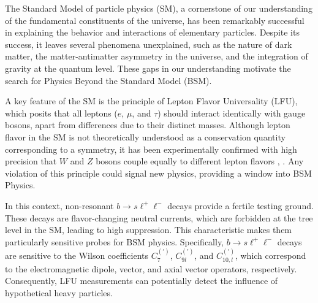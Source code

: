 The Standard Model of particle physics (SM), a cornerstone of our 
understanding of the fundamental constituents of the universe, 
has been remarkably successful in explaining the behavior 
and interactions of elementary particles. Despite its success, 
it leaves several phenomena unexplained, such as the 
nature of dark matter, the matter-antimatter asymmetry in the 
universe, and the integration of gravity at the quantum level. 
These gaps in our understanding motivate the search for Physics 
Beyond the Standard Model (BSM).\cite{SM_BSM}

A key feature of the SM is the principle of Lepton 
Flavor Universality (LFU), which posits that all leptons ($e$, 
$\mu$, and $\tau$) should interact identically with gauge bosons, 
apart from differences due to their distinct masses. Although 
lepton flavor in the SM is not theoretically understood 
as a conservation quantity corresponding to a symmetry, it has 
been experimentally confirmed with high precision that $W$ and $Z$ 
bosons couple equally to different lepton flavors \cite{LU_CDF}, 
\cite{LU_ATLAS}. Any violation of this principle could signal new 
physics, providing a window into BSM Physics.

In this context, non-resonant $b\to s\ell^+\ell^-$ decays provide a fertile 
testing ground. These decays are flavor-changing neutral currents, 
which are forbidden at the tree level in the SM, leading to high 
suppression. This characteristic makes them particularly sensitive 
probes for BSM physics. Specifically, $b\to s\ell^+\ell^-$ decays are 
sensitive to the Wilson coefficients $C_7^{\scriptscriptstyle (')}$, 
$C_{9l}^{\scriptscriptstyle (')}$, and $C_{10,l}^{\scriptscriptstyle (')}$, 
which correspond to the electromagnetic dipole, vector, and axial 
vector operators, respectively. %
Consequently, LFU measurements can potentially detect the influence 
of hypothetical heavy particles.

